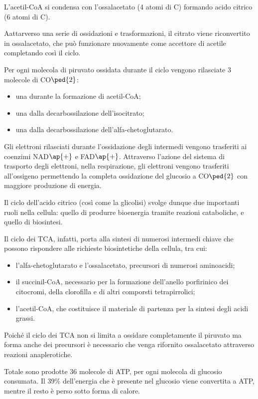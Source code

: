 \documentclass[11pt]{book}
\begin{document}
L’acetil-CoA si condensa con l’ossalacetato (4 atomi di C) formando acido citrico (6 atomi di C). 

Aattarverso una serie di ossidazioni e trasformazioni, il citrato viene riconvertito in ossalacetato, che può funzionare nuovamente come accettore di acetile completando così il ciclo. 

Per ogni molecola di piruvato ossidata durante il ciclo vengono rilasciate 3 molecole di CO$\ped{2}$:
\begin{itemize}
\item una durante la formazione di acetil-CoA;
\item una dalla decarbossilazione dell’isocitrato;
\item una dalla decarbossilazione dell’alfa-chetoglutarato.
\end{itemize}
 
Gli elettroni rilasciati durante l’ossidazione degli intermedi vengono trasferiti ai coenzimi NAD$\ap{+}$ e FAD$\ap{+}$. Attraverso l’azione del sistema di trasporto degli elettroni, nella respirazione, gli elettroni vengono trasferiti all’ossigeno permettendo la completa ossidazione del glucosio a CO$\ped{2}$ con maggiore produzione di energia.

Il ciclo dell’acido citrico (così come la glicolisi) svolge dunque due importanti ruoli nella cellula: quello di produrre bioenergia tramite reazioni cataboliche, e quello di biosintesi.

Il ciclo dei TCA, infatti, porta alla sintesi di numerosi intermedi chiave che possono rispondere alle richieste biosintetiche della cellula, tra cui:
\begin{itemize}
\item l’alfa-chetoglutarato e l’ossalacetato, precursori di numerosi aminoacidi;
\item il succinil-CoA, necessario per la formazione dell’anello porfirinico dei citocromi, della clorofilla e di altri comporsti tetrapirrolici;
\item l’acetil-CoA, che costituisce il materiale di partenza per la sintesi degli acidi grassi.
\end{itemize}

Poiché il ciclo dei TCA non si limita a ossidare completamente il piruvato ma forma anche dei precursori è necessario che venga rifornito ossalacetato attraverso reazioni anaplerotiche.

Totale sono prodotte 36 molecole di ATP, per ogni molecola di glucosio consumata. Il 39$\%$ dell’energia che è presente nel glucosio viene convertita a ATP, mentre il resto è perso sotto forma di calore.
\end{document}
